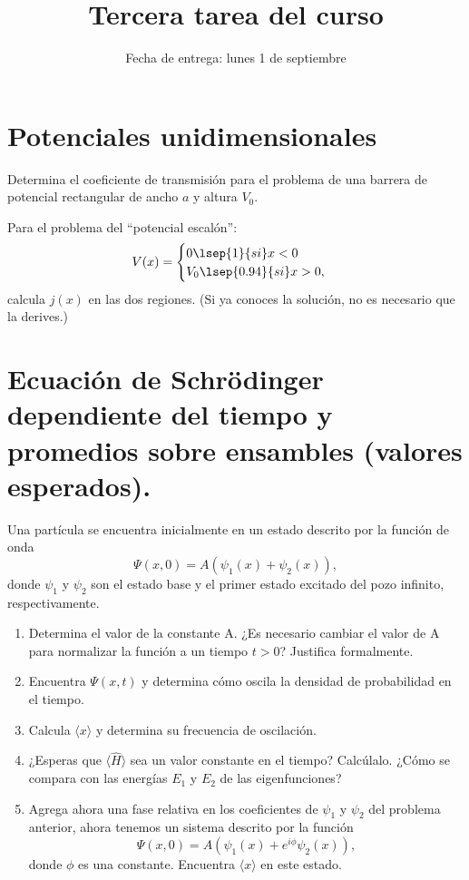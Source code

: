 \documentclass[10pt,letterpaper]{article}
\title{Tercera tarea del curso}
\date{Fecha de entrega: lunes 1 de septiembre}
\newenvironment{modenumerate}
  {\enumerate\setupmodenumerate}
  {\endenumerate}
\newif\ifmoditem
\newcommand{\setupmodenumerate}{%
  \global\moditemfalse
  \let\origmakelabel\makelabel
  \def\moditem##1{\global\moditemtrue\def\mesymbol{##1}\item}%
  \def\makelabel##1{%
    \origmakelabel{##1\ifmoditem\rlap{\mesymbol}\fi\enspace}%
    \global\moditemfalse}%
}
\begin{document}
\maketitle

\section{Potenciales unidimensionales}

\begin{modenumerate}
\moditem{} Determina el coeficiente de transmisión para el problema de una barrera de potencial rectangular de ancho $a$ y altura $V_0$.

\item Para el problema del ``potencial escalón'':
\begin{equation}
V(x) = \begin{cases}
0 \lsep{1}{ si} x<0\\
V_0 \lsep{0.94}{si} x>0,
\end{cases}
\end{equation}
calcula $j(x)$ en las dos regiones. (Si ya conoces la solución, no es necesario que la derives.)

\section{Ecuación de Schrödinger dependiente del tiempo y promedios sobre ensambles (valores esperados).}

\moditem{} \label{item2} Una partícula se encuentra inicialmente en un estado descrito por la función de onda
\begin{equation}
\Psi(x,0) = A\left( \psi_1(x)+\psi_2(x)\right),
\label{Pozo}
\end{equation}
donde $\psi_1$ y $\psi_2$ son el estado base y el primer estado excitado del pozo infinito, respectivamente.
\begin{enumerate}
\renewcommand{\theenumi}{\Alph{enumi}}
\item Determina el valor de la constante A. ¿Es necesario cambiar el valor de A para normalizar la función a un tiempo $t>0$? Justifica formalmente.
\item Encuentra $\Psi(x,t)$ y determina cómo oscila la densidad de probabilidad en el tiempo.
\item Calcula $\langle x\rangle$ y determina su frecuencia de oscilación.
\item ¿Esperas que $\langle \hat{H} \rangle$ sea un valor constante en el tiempo? Calcúlalo. ¿Cómo se compara con las energías $E_1$ y $E_2$ de las eigenfunciones?
\item Agrega ahora una fase relativa en los coeficientes de $\psi_1$ y $\psi_2$ del problema anterior, ahora tenemos un sistema descrito por la función
\begin{equation}
\Psi(x,0) = A\left( \psi_1(x) + e^{i\phi} \psi_2(x) \right),
\label{Pozo2}
\end{equation}
donde $\phi$ es una constante. Encuentra $\langle x \rangle$ en este estado.
\end{enumerate}


\end{modenumerate}
\end{document}
